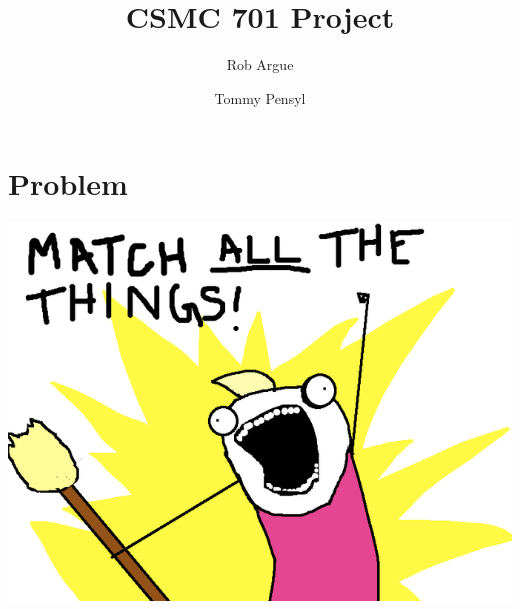 \documentclass[11pt,letterpaper]{article}
\begin{document}
\title{CSMC 701 Project}
\author{Rob Argue \and Tommy Pensyl}
\maketitle
\section{Problem}
\includegraphics{things.png}

\maketitle
\end{document}
